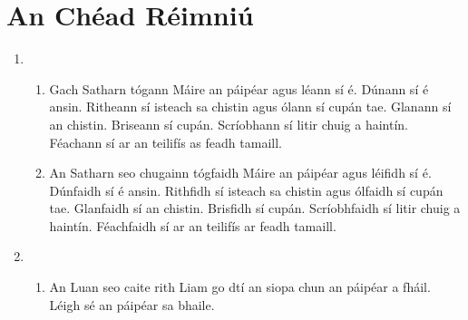 \documentclass[article,a4paper]{memoir}
\begin{document}
\chapter*{An Ch\'{e}ad R\'{e}imniú}

\begin{enumerate}[{\bfseries 1}]
	\item 	\begin{enumerate}[{\bfseries a)}]
			\item Gach Satharn tógann Máire an páip\'{e}ar agus
				l\'{e}ann sí \'{e}. Dúnann sí \'{e} ansin. 					Ritheann sí
				isteach sa chistin agus ólann sí cupán tae.
				Glanann sí an chistin. Briseann sí cupán.
				Scríobhann sí litir chuig a haintín.
				F\'{e}achann sí ar an teilifís as feadh
				tamaill.
			\item An Satharn seo chugainn tógfaidh Máire an
				páip\'{e}ar agus l\'{e}ifidh sí \'{e}. Dúnfaidh
				sí \'{e} ansin. Rithfidh sí isteach sa chistin 					agus
				ólfaidh sí cupán tae. Glanfaidh sí an chistin.
				Brisfidh sí cupán. Scríobhfaidh sí litir chuig
				a haintín. F\'{e}achfaidh sí ar an teilifís ar
				feadh tamaill.
		\end{enumerate}
	\item   \begin{enumerate}[{\bfseries a)}]
			\item An Luan seo caite rith Liam go dtí an siopa chun
				an páip\'{e}ar a fháil. L\'{e}igh s\'{e} an
				páip\'{e}ar sa bhaile.
		\end{enumerate}
\end{enumerate}
\end{document}
